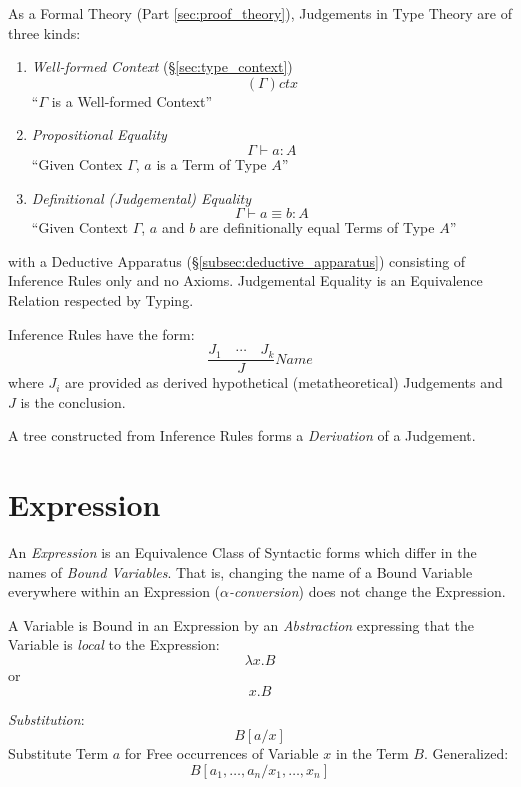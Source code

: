 \documentclass{article}
\begin{document}
As a Formal Theory (Part \ref{sec:proof_theory}), Judgements in Type
Theory are of three kinds\cite{hott13}:
\begin{enumerate}

\item \emph{Well-formed Context} (\S\ref{sec:type_context})
\[
    (\Gamma) ctx
\]
``$\Gamma$ is a Well-formed Context''

\item \emph{Propositional Equality}
\[
    \Gamma \vdash a : A
\]
``Given Contex $\Gamma$, $a$ is a Term of Type $A$''

\item \emph{Definitional (Judgemental) Equality}
\[
    \Gamma \vdash a \equiv b : A
\]
``Given Context $\Gamma$, $a$ and $b$ are definitionally equal Terms
of Type $A$''

\end{enumerate}
with a Deductive Apparatus (\S\ref{subsec:deductive_apparatus})
consisting of Inference Rules only and no Axioms. Judgemental Equality
is an Equivalence Relation respected by Typing.

Inference Rules have the form:
\[
    \frac{J_1 \quad \cdots \quad J_k} {J} Name
\]
where $J_i$ are provided as derived hypothetical (metatheoretical)
Judgements and $J$ is the conclusion.

A tree constructed from Inference Rules forms a \emph{Derivation} of a
Judgement.



\section{Expression}\label{sec:type_expression}

An \emph{Expression} is an Equivalence Class of Syntactic forms which
differ in the names of \emph{Bound Variables}. That is, changing the
name of a Bound Variable everywhere within an Expression
(\emph{$\alpha$-conversion}) does not change the Expression.

A Variable is Bound in an Expression by an \emph{Abstraction}
expressing that the Variable is \emph{local} to the Expression:
\[
    \lambda x.B
\]
or
\[
    x.B
\]

\emph{Substitution}:
\[
    B[a/x]
\]
Substitute Term $a$ for Free occurrences of Variable $x$ in the Term
$B$. Generalized:
\[
    B[a_1,\ldots,a_n / x_1,\ldots,x_n]
\]
\end{document}
